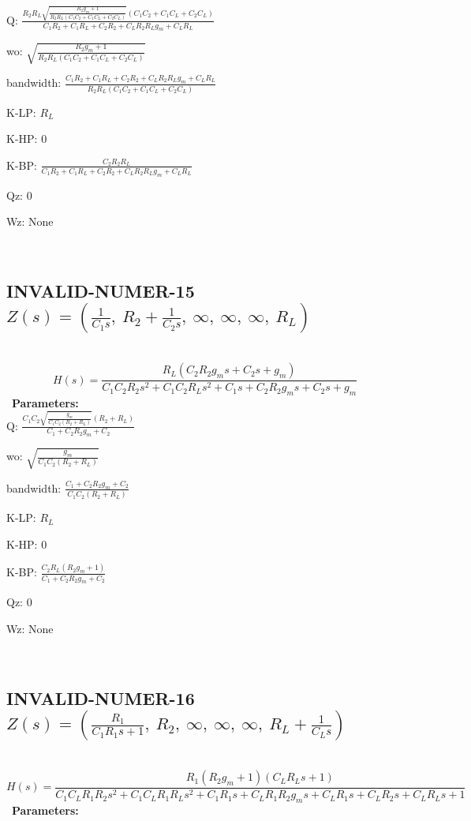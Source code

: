 \documentclass{article}
\begin{document}
Q: $\frac{R_{2} R_{L} \sqrt{\frac{R_{2} g_{m} + 1}{R_{2} R_{L} \left(C_{1} C_{2} + C_{1} C_{L} + C_{2} C_{L}\right)}} \left(C_{1} C_{2} + C_{1} C_{L} + C_{2} C_{L}\right)}{C_{1} R_{2} + C_{1} R_{L} + C_{2} R_{2} + C_{L} R_{2} R_{L} g_{m} + C_{L} R_{L}}$\ 

wo: $\sqrt{\frac{R_{2} g_{m} + 1}{R_{2} R_{L} \left(C_{1} C_{2} + C_{1} C_{L} + C_{2} C_{L}\right)}}$\ 

bandwidth: $\frac{C_{1} R_{2} + C_{1} R_{L} + C_{2} R_{2} + C_{L} R_{2} R_{L} g_{m} + C_{L} R_{L}}{R_{2} R_{L} \left(C_{1} C_{2} + C_{1} C_{L} + C_{2} C_{L}\right)}$\ 

K-LP: $R_{L}$\ 

K-HP: $0$\ 

K-BP: $\frac{C_{2} R_{2} R_{L}}{C_{1} R_{2} + C_{1} R_{L} + C_{2} R_{2} + C_{L} R_{2} R_{L} g_{m} + C_{L} R_{L}}$\ 

Qz: $0$\ 

Wz: $\text{None}$\ 

\ 

\subsection{INVALID-NUMER-15 $Z(s) = \left( \frac{1}{C_{1} s}, \  R_{2} + \frac{1}{C_{2} s}, \  \infty, \  \infty, \  \infty, \  R_{L}\right)$ } \ 
\textbf{\[H(s) = \frac{R_{L} \left(C_{2} R_{2} g_{m} s + C_{2} s + g_{m}\right)}{C_{1} C_{2} R_{2} s^{2} + C_{1} C_{2} R_{L} s^{2} + C_{1} s + C_{2} R_{2} g_{m} s + C_{2} s + g_{m}}\] } \ 
\textbf{Parameters:}\\ 

Q: $\frac{C_{1} C_{2} \sqrt{\frac{g_{m}}{C_{1} C_{2} \left(R_{2} + R_{L}\right)}} \left(R_{2} + R_{L}\right)}{C_{1} + C_{2} R_{2} g_{m} + C_{2}}$\ 

wo: $\sqrt{\frac{g_{m}}{C_{1} C_{2} \left(R_{2} + R_{L}\right)}}$\ 

bandwidth: $\frac{C_{1} + C_{2} R_{2} g_{m} + C_{2}}{C_{1} C_{2} \left(R_{2} + R_{L}\right)}$\ 

K-LP: $R_{L}$\ 

K-HP: $0$\ 

K-BP: $\frac{C_{2} R_{L} \left(R_{2} g_{m} + 1\right)}{C_{1} + C_{2} R_{2} g_{m} + C_{2}}$\ 

Qz: $0$\ 

Wz: $\text{None}$\ 

\ 

\subsection{INVALID-NUMER-16 $Z(s) = \left( \frac{R_{1}}{C_{1} R_{1} s + 1}, \  R_{2}, \  \infty, \  \infty, \  \infty, \  R_{L} + \frac{1}{C_{L} s}\right)$ } \ 
\textbf{\[H(s) = \frac{R_{1} \left(R_{2} g_{m} + 1\right) \left(C_{L} R_{L} s + 1\right)}{C_{1} C_{L} R_{1} R_{2} s^{2} + C_{1} C_{L} R_{1} R_{L} s^{2} + C_{1} R_{1} s + C_{L} R_{1} R_{2} g_{m} s + C_{L} R_{1} s + C_{L} R_{2} s + C_{L} R_{L} s + 1}\] } \ 
\textbf{Parameters:}\\ 
\end{document}
